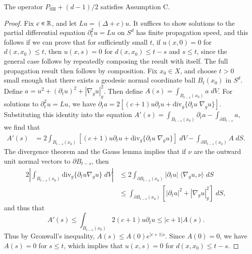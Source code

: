 \begin{lemma}
  The operator $P_{\text{SH}} + (d-1)/2$ satisfies Assumption C.
\end{lemma}
\begin{proof}
  Fix $c \in \operatorname{\mathbb{R}}$, and let $Lu = (\Delta + c) u$. It suffices to show solutions to the partial differential equation $\partial_t^2 u = Lu$ on $S^d$ has finite propagation speed, and this follows if we can prove that for sufficiently small $t$, if $u(x,0) = 0$ for $d(x,x_0) \leq t$, then $u(x,s) = 0$ for $d(x,x_0) \leq t - s$ and $s \leq t$, since the general case follows by repeatedly composing the result with itself. The full propagation result then follows by composition. Fix $x_0 \in X$, and choose $t > 0$ small enough that there exists a geodesic normal coordinate ball $B_t(x_0)$ in $S^d$. Define $a = u^2 + (\partial_t u)^2 + |\nabla_g u|_g^2$. Then define $A(s) = \int_{B_{t-s}(x_0)} a\; dV$. For solutions to $\partial_t^2 u = Lu$, we have $\partial_t a = 2[ (c + 1) u \partial_t u + \text{div}_g \{ \partial_t u\; \nabla_g u \} ]$.
  Substituting this identity into the equation $A'(s) = \int_{B_{t-s}(x_0)} \partial_t a - \int_{\partial B_{t-s}} a$, we find that
  \begin{equation}
  \begin{split}
    A'(s) &= 2 \int_{B_{t-s}(x_0)} [(c+1) u \partial_t u + \text{div}_g \{ \partial_t u\; \nabla_g u \}]\; dV - \int_{\partial B_{t-s}(x_0)} A\; dS.
  \end{split}
  \end{equation}
  The divergence theorem and the Gauss lemma implies that if $\nu$ are the outward unit normal vectors to $\partial B_{t-s}$, then
  \begin{equation}
  \begin{split}
    2 \left| \int_{B_{t-s}(x_0)} \text{div}_g \{ \partial_t u \nabla_g u \}\; dV \right| &\leq 2 \int_{\partial B_{t-s}(x_0)} |\partial_t u|\; \langle \nabla_g u, \nu \rangle\; dS\\\
    &\leq \int_{\partial B_{t-s}(x_0)} [|\partial_t u|^2 + |\nabla_g u|_g^2]\; dS,
  \end{split}
  \end{equation}
  and thus that
  \begin{equation}
    A'(s) \leq \int_{B_{t-s}(x_0)} 2(c+1) u \partial_t u \leq |c + 1| A(s).
  \end{equation}
  Thus by Gronwall's inequality, $A(s) \leq A(0) e^{|c+1|s}$. Since $A(0) = 0$, we have $A(s) = 0$ for $s \leq t$, which implies that $u(x,s) = 0$ for $d(x,x_0) \leq t - s$.
\end{proof}

